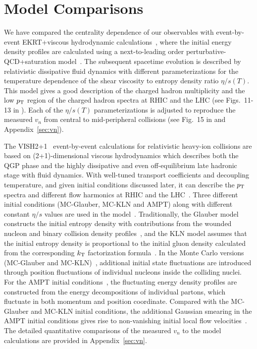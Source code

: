 \section{Model Comparisons}
\label{sec:theory}
We have compared the centrality dependence of our observables with event-by-event EKRT+viscous hydrodynamic calculations~\cite{Niemi:2015qia}, where the initial energy density profiles are calculated using a next-to-leading order perturbative-QCD+saturation model~\cite{Paatelainen:2012at,Paatelainen:2013eea}. The subsequent spacetime evolution is described by relativistic dissipative fluid dynamics with different parameterizations for the temperature dependence of the shear viscosity to entropy density ratio $\eta/s(T)$. 
This model gives a good description of the charged hadron multiplicity and the low $p_{\rm T}$ region of the charged hadron spectra at RHIC and the LHC (see Figs.~11-13 in \cite{Niemi:2015qia}).
Each of the $\eta/s(T)$ parameterizations is adjusted to reproduce the measured $v_n$ from central to mid-peripheral collisions (see Fig.~15 in \cite{Niemi:2015qia} and Appendix~\ref{sec:vn}). 

The VISH2+1~\cite{Shen:2010uy,Shen:2014vra} event-by-event calculations for relativistic heavy-ion collisions are based on (2+1)-dimensional viscous hydrodynamics which describes both the QGP phase and the highly dissipative and even off-equilibrium late hadronic stage with fluid dynamics. With well-tuned transport coefficients and decoupling temperature, and given initial conditions discussed later, it can describe the $p_{\rm T}$ spectra and different flow harmonics at RHIC and the LHC~\cite{Qiu:2011hf, Shen:2010uy, Shen:2011eg, Bhalerao:2015iya}.
Three different initial conditions ({MC-Glauber}, {MC-KLN} and {AMPT}) along with different constant $\eta/s$ values are used in the model~\cite{Zhu:2016puf}. 
Traditionally, the Glauber model constructs the initial entropy density with contributions from the wounded nucleon and binary collision density profiles~\cite{Kolb:2000sd}, and the {KLN} model assumes that the initial entropy density is proportional to the initial gluon density calculated from the corresponding $k_{\rm T}$ factorization formula~\cite{Kharzeev:2000ph}. In the Monte Carlo versions ({MC-Glauber} and {MC-KLN})~\cite{Miller:2007ri,Drescher:2006ca,Hirano:2009ah}, additional initial state fluctuations are introduced through position fluctuations of individual nucleons inside the colliding nuclei. For the {AMPT} initial conditions~\cite{Bhalerao:2015iya,Pang:2012he,Xu:2016hmp}, the fluctuating energy density profiles are constructed from the energy decompositions of individual partons, which fluctuate in both momentum and position coordinate. Compared with the {MC-Glauber} and {MC-KLN} initial conditions, the additional Gaussian smearing in the {AMPT} initial conditions gives rise to non-vanishing initial local flow velocities~\cite{Pang:2012he}. The detailed quantitative comparisons of the measured $v_n$ to the model calculations are provided in Appendix~\ref{sec:vn}.

